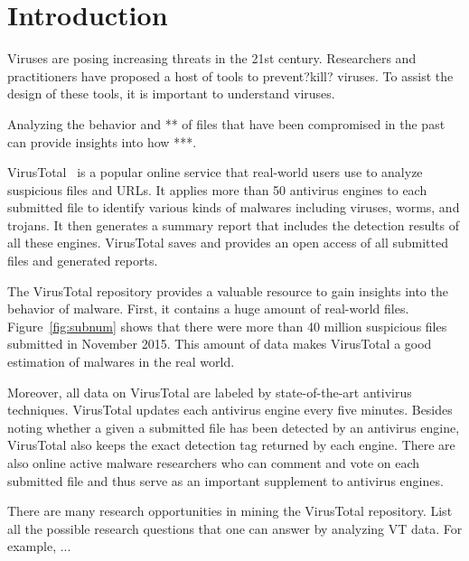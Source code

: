 \section{Introduction}

Viruses are posing increasing threats in the 21st century. 
Researchers and practitioners have proposed a host of tools to prevent?kill? viruses. 
To assist the design of these tools, it is important to understand viruses.

Analyzing the behavior and ** of files that have been compromised in the past
can provide insights into how ***.

VirusTotal~\cite{virustotal} is a popular online service that real-world users use to analyze suspicious files and URLs.
It applies more than 50 antivirus engines to each submitted file 
to identify various kinds of malwares including viruses, worms, and trojans. 
It then generates a summary report that includes the detection results of all these engines. 
VirusTotal saves and provides an open access of all submitted files and generated reports. 

The VirusTotal repository provides a valuable resource to gain insights into 
the behavior of malware.
%
First, it contains a huge amount of real-world files.
Figure~\ref{fig:subnum} shows that there were more than 40 million suspicious files 
submitted in November 2015. 
This amount of data makes VirusTotal a good estimation of malwares in the real world. 

Moreover, all data on VirusTotal are labeled by state-of-the-art antivirus techniques. 
VirusTotal updates each antivirus engine every five minutes. 
Besides noting whether a given a submitted file has been detected by an antivirus engine, 
VirusTotal also keeps the exact detection tag returned by each engine. 
There are also online active malware researchers 
who can comment and vote on each submitted file 
and thus serve as an important supplement to antivirus engines. 

There are many research opportunities in mining the VirusTotal repository. 
List all the possible research questions that one can answer by analyzing VT data.
For example, ...

